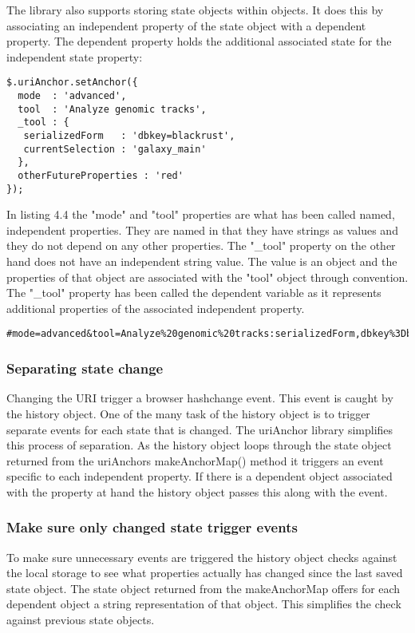 \documentclass[english]{ifimaster}
\begin{document}
The library also supports storing state objects within objects. It does this by associating an independent property of the state object with a dependent property. The dependent property holds the additional associated state for the independent state property:

\begin{lstlisting}[caption=The UriAnchor library. Parsed complex object.]
  $.uriAnchor.setAnchor({
  mode  : 'advanced',
  tool  : 'Analyze genomic tracks',
  _tool : {
   serializedForm   : 'dbkey=blackrust',
   currentSelection : 'galaxy_main'
  },
  otherFutureProperties : 'red'
});
\end{lstlisting}

In listing 4.4 the "mode" and "tool" properties are what has been called named, independent properties. They are named in that they have strings as values and they do not depend on any other properties. The "\_tool" property on the other hand does not have an independent string value. The value is an object and the properties of that object are associated with the "tool" object through convention. The "\_tool" property has been called the dependent variable as it represents additional properties of the associated independent property. 

\begin{lstlisting}[caption=Example of a stringified complex object.]
#mode=advanced&tool=Analyze%20genomic%20tracks:serializedForm,dbkey%3Dblackrust
\end{lstlisting}

\subsubsection{Separating state change}
Changing the URI trigger a browser hashchange event. This event is caught by the history object. One of the many task of the history object is to trigger separate events for each state that is changed. The uriAnchor library simplifies this process of separation. As the history object loops through the state object returned from the uriAnchors makeAnchorMap() method it triggers an event specific to each independent property. If there is a dependent object associated with the property at hand the history object passes this along with the event. 

\subsubsection{Make sure only changed state trigger events}
To make sure unnecessary events are triggered the history object checks against the local storage to see what properties actually has changed since the last saved state object. The state object returned from the makeAnchorMap offers for each dependent object a string representation of that object. This simplifies the check against previous state objects.
\end{document}
